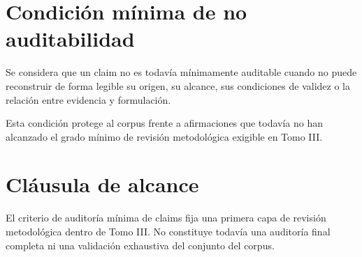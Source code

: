 \section{Condición mínima de no auditabilidad}
\begin{definition}
Se considera que un claim no es todavía mínimamente auditable cuando no puede reconstruir de forma legible su origen, su alcance, sus condiciones de validez o la relación entre evidencia y formulación.
\end{definition}

\begin{observation}
Esta condición protege al corpus frente a afirmaciones que todavía no han alcanzado el grado mínimo de revisión metodológica exigible en Tomo III.
\end{observation}

\section{Cláusula de alcance}
\begin{observation}
El criterio de auditoría mínima de claims fija una primera capa de revisión metodológica dentro de Tomo III. No constituye todavía una auditoría final completa ni una validación exhaustiva del conjunto del corpus.
\end{observation}

